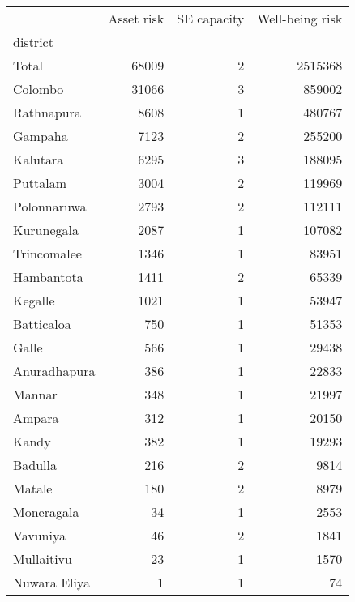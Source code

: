 \begin{tabular}{lrrr}
\toprule
{} &  Asset risk &  SE capacity &  Well-being risk \\
district     &             &              &                  \\
\midrule
Total        &       68009 &            2 &          2515368 \\
Colombo      &       31066 &            3 &           859002 \\
Rathnapura   &        8608 &            1 &           480767 \\
Gampaha      &        7123 &            2 &           255200 \\
Kalutara     &        6295 &            3 &           188095 \\
Puttalam     &        3004 &            2 &           119969 \\
Polonnaruwa  &        2793 &            2 &           112111 \\
Kurunegala   &        2087 &            1 &           107082 \\
Trincomalee  &        1346 &            1 &            83951 \\
Hambantota   &        1411 &            2 &            65339 \\
Kegalle      &        1021 &            1 &            53947 \\
Batticaloa   &         750 &            1 &            51353 \\
Galle        &         566 &            1 &            29438 \\
Anuradhapura &         386 &            1 &            22833 \\
Mannar       &         348 &            1 &            21997 \\
Ampara       &         312 &            1 &            20150 \\
Kandy        &         382 &            1 &            19293 \\
Badulla      &         216 &            2 &             9814 \\
Matale       &         180 &            2 &             8979 \\
Moneragala   &          34 &            1 &             2553 \\
Vavuniya     &          46 &            2 &             1841 \\
Mullaitivu   &          23 &            1 &             1570 \\
Nuwara Eliya &           1 &            1 &               74 \\
\bottomrule
\end{tabular}
